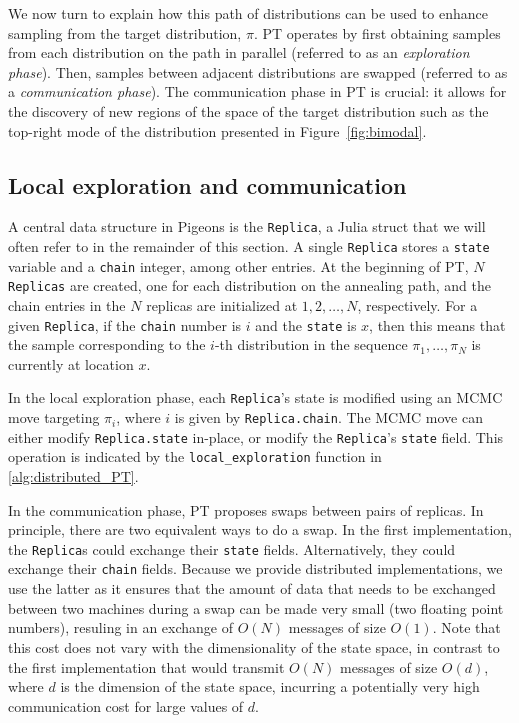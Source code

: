 We now turn to explain how this path of distributions can be used to enhance 
sampling from the target distribution, $\pi$. 
PT operates by first obtaining samples from each distribution on the path in parallel 
(referred to as an \textit{exploration phase}). 
Then, samples between adjacent distributions are swapped (referred to as 
a \textit{communication phase}). The communication phase in PT is crucial: it allows 
for the discovery of new regions of the space of the target distribution such as 
the top-right mode of the distribution presented in Figure~\ref{fig:bimodal}. 




\subsection{Local exploration and communication}
A central data structure in Pigeons is the \texttt{Replica}, a Julia struct 
that we will often refer to in the remainder of this section. 
A single \texttt{Replica} stores a \texttt{state} variable and a \texttt{chain} 
integer, among other entries. 
At the beginning of PT, $N$ \texttt{Replicas} are created, 
one for each distribution on the annealing path, and 
the chain entries in the $N$ replicas are initialized at $1,2,\ldots,N$, respectively. 
For a given \texttt{Replica}, if the \texttt{chain} number is $i$ and the \texttt{state}
is $x$, then this means that the sample corresponding to the $i$-th distribution in 
the sequence $\pi_1, \ldots, \pi_N$ is currently at location $x$.  

 
In the local exploration phase,
each \texttt{Replica}'s state is modified using an MCMC move targeting $\pi_i$,
where $i$ is given by \texttt{Replica.chain}.
The MCMC move can either modify \texttt{Replica.state} in-place, or modify the 
\texttt{Replica}'s \texttt{state} field. 
This operation is indicated by the \texttt{local\_exploration} function in 
\cref{alg:distributed_PT}.

 
In the communication phase, PT proposes swaps between pairs of replicas. 
In principle, there are two equivalent ways to do a swap.
In the first implementation, the \texttt{Replica}s 
could exchange their \texttt{state} fields.
Alternatively, they could exchange their \texttt{chain} fields.
Because we provide distributed implementations, we use the latter as it ensures that 
the amount of data that needs to be exchanged between two machines during a swap 
can be made very small (two floating point numbers), resuling in 
an exchange of $O(N)$ messages of size $O(1)$. 
Note that this cost does not vary with the dimensionality of the state space, 
in contrast to the first implementation that would transmit 
$O(N)$ messages of size $O(d)$, where $d$ is the dimension of the state space,
incurring a potentially very high communication cost for large values of $d$.

